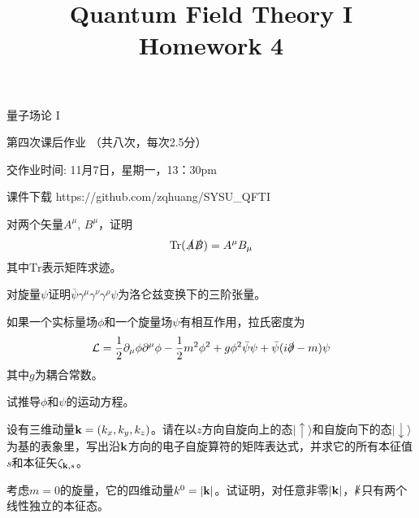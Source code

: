 \documentclass[CJK]{beamer}
\title{Quantum Field Theory I \\ Homework 4}
\author{}
\date{}
\begin{document}
\begin{frame}
 
\begin{center}
\begin{Large}
\bch
量子场论 I 

{\vskip 0.3in}

第四次课后作业 （共八次，每次2.5分）

交作业时间: 11月7日，星期一，13：30pm

\ech
\end{Large}
\end{center}

\vskip 0.2in

\bch
课件下载
\ech
https://github.com/zqhuang/SYSU\_QFTI

\end{frame}

\begin{frame}
\bch
对两个矢量$A^\mu$, $B^\mu$，证明
$$\mathrm{Tr}(\slashed{A}\slashed{B}) = A^\mu B_\mu$$
其中$\mathrm{Tr}$表示矩阵求迹。
\ech
\end{frame}

\begin{frame}
\bch
对旋量$\psi$证明$\bar{\psi}\gamma^\mu\gamma^\nu\gamma^\rho\psi$为洛仑兹变换下的三阶张量。
\ech
\end{frame}

\begin{frame}
\bch
如果一个实标量场$\phi$和一个旋量场$\psi$有相互作用，拉氏密度为
$${\mathcal{L}} = \frac{1}{2}\partial_\mu\phi\partial^\mu\phi - \frac{1}{2}m^2\phi^2 + g\phi^2\bar\psi\psi + \bar\psi(i\slashed{\partial}-m)\psi$$
其中$g$为耦合常数。

试推导$\phi$和$\psi$的运动方程。
\ech
\end{frame}


\begin{frame}
\bch
设有三维动量${\mathbf{k}} = (k_x, k_y, k_z)$。请在以$z$方向自旋向上的态$|\uparrow\rangle$和自旋向下的态$|\downarrow\rangle$为基的表象里，写出沿${\mathbf{k}}$方向的电子自旋算符的矩阵表达式，并求它的所有本征值$s$和本征矢$\zeta_{{\mathbf{k}},s}$。
\ech
\end{frame}


\begin{frame}
\bch
考虑$m=0$的旋量，它的四维动量$k^0 = |{\mathbf{k}}|$。试证明，对任意非零$|{\mathbf{k}}|$，$\slashed{k}$只有两个线性独立的本征态。 
\ech
\end{frame}
\end{document}
